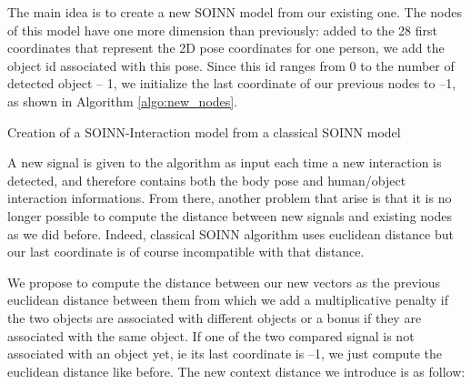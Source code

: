 The main idea is to create a new SOINN model from our existing one. The nodes of this model have one more dimension than previously: added to the 28 first coordinates that represent the 2D pose coordinates for one person, we add the object id associated with this pose. Since this id ranges from 0 to the number of detected object -- 1, we initialize the last coordinate of our previous nodes to --1, as shown in Algorithm \ref{algo:new_nodes}.

\begin{algorithm}[H]
    \label{algo:new_nodes}
    \caption{Creation of a SOINN-Interaction model from a classical SOINN model}
\end{algorithm}

A new signal is given to the algorithm as input each time a new interaction is detected, and therefore contains both the body pose and human/object interaction informations. From there, another problem that arise is that it is no longer possible to compute the distance between new signals and existing nodes as we did before. Indeed, classical SOINN algorithm uses euclidean distance but our last coordinate is of course incompatible with that distance. 

We propose to compute the distance between our new vectors as the previous euclidean distance between them from which we add a multiplicative penalty if the two objects are associated with different objects or a bonus if they are associated with the same object. If one of the two compared signal is not associated with an object yet, ie its last coordinate is --1, we just compute the euclidean distance like before. The new context distance we introduce is as follow:

